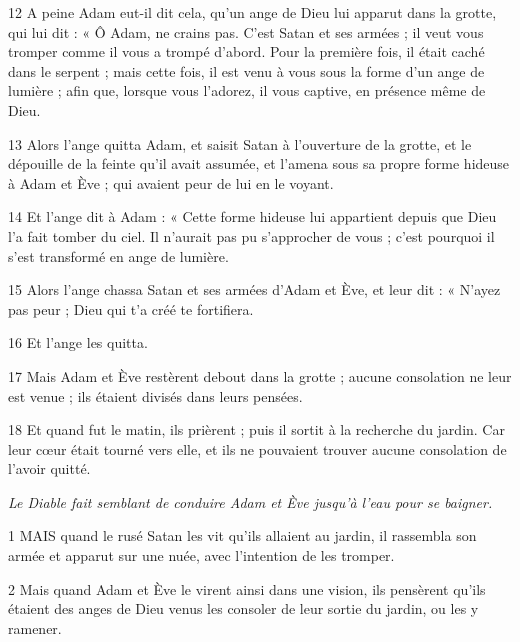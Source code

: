 \par 12 A peine Adam eut-il dit cela, qu'un ange de Dieu lui apparut dans la grotte, qui lui dit : « Ô Adam, ne crains pas. C'est Satan et ses armées ; il veut vous tromper comme il vous a trompé d'abord. Pour la première fois, il était caché dans le serpent ; mais cette fois, il est venu à vous sous la forme d'un ange de lumière ; afin que, lorsque vous l'adorez, il vous captive, en présence même de Dieu.

\par 13 Alors l'ange quitta Adam, et saisit Satan à l'ouverture de la grotte, et le dépouille de la feinte qu'il avait assumée, et l'amena sous sa propre forme hideuse à Adam et Ève ; qui avaient peur de lui en le voyant.

\par 14 Et l'ange dit à Adam : « Cette forme hideuse lui appartient depuis que Dieu l'a fait tomber du ciel. Il n'aurait pas pu s'approcher de vous ; c’est pourquoi il s’est transformé en ange de lumière.

\par 15 Alors l'ange chassa Satan et ses armées d'Adam et Ève, et leur dit : « N'ayez pas peur ; Dieu qui t’a créé te fortifiera.

\par 16 Et l'ange les quitta.

\par 17 Mais Adam et Ève restèrent debout dans la grotte ; aucune consolation ne leur est venue ; ils étaient divisés dans leurs pensées.

\par 18 Et quand fut le matin, ils prièrent ; puis il sortit à la recherche du jardin. Car leur cœur était tourné vers elle, et ils ne pouvaient trouver aucune consolation de l’avoir quitté.


\par \textit{Le Diable fait semblant de conduire Adam et Ève jusqu'à l'eau pour se baigner.}

\par 1 MAIS quand le rusé Satan les vit qu'ils allaient au jardin, il rassembla son armée et apparut sur une nuée, avec l'intention de les tromper.

\par 2 Mais quand Adam et Ève le virent ainsi dans une vision, ils pensèrent qu'ils étaient des anges de Dieu venus les consoler de leur sortie du jardin, ou les y ramener.

